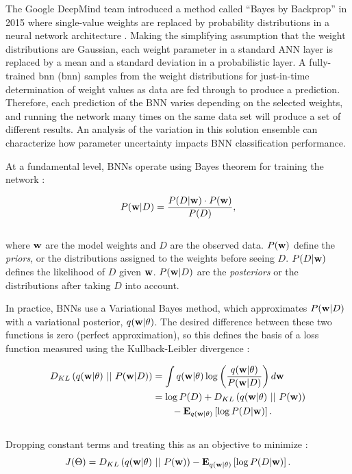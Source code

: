 The Google DeepMind team introduced a method called ``Bayes by Backprop'' in 2015 where single-value weights are replaced by probability distributions in a neural network architecture \citep{blundell_weight_2015}. Making the simplifying assumption that the weight distributions are Gaussian, each weight parameter in a standard ANN layer is replaced by a mean and a standard deviation in a probabilistic layer. A fully-trained \acrlong{bnn} (\acrshort{bnn}) samples from the weight distributions for just-in-time determination of weight values as data are fed through to produce a prediction. Therefore, each prediction of the BNN varies depending on the selected weights, and running the network many times on the same data set will produce a set of different results. An analysis of the variation in this solution ensemble can characterize how parameter uncertainty impacts BNN classification performance.

At a fundamental level, BNNs operate using Bayes theorem for training the network \citep{webster_probabilistic_2021}:

\begin{equation}
    \label{eq:bayesrule}
    P({\bf w} \vert D) = \frac{P(D \vert {\bf w}) \cdot P({\bf w})}{P(D)},
\end{equation}
\\
where ${\bf w}$ are the model weights and $D$ are the observed data. $P({\bf w})$ define the \textit{priors}, or the distributions assigned to the weights before seeing $D$. $P(D \vert {\bf w})$ defines the likelihood of $D$ given ${\bf w}$. $P({\bf w} \vert D)$ are the \textit{posteriors} or the distributions after taking $D$ into account.

In practice, BNNs use a Variational Bayes method, which approximates $P({\bf w} \vert D)$ with a variational posterior, $q({\bf w} \vert \theta)$. The desired difference between these two functions is zero (perfect approximation), so this defines the basis of a loss function measured using the Kullback-Leibler divergence \citep{webster_probabilistic_2021}:

\begin{equation}
    \label{eq:bnn_loss}
    \begin{aligned}
    D_{KL}\left(q({\bf w} \vert \theta)\ \vert\vert\ P({\bf w} \vert D)\right) &= \int{q({\bf w} \vert \theta) \log \left({\frac{q({\bf w} \vert \theta)}{P({\bf w} \vert D)}}\right) d{\bf w}} \\
    &= \log P(D) + D_{KL}\left(q({\bf w} \vert \theta)\ \vert\vert\ P({\bf w})\right) \\ 
    &\qquad- \mathbf{E}_{q({\bf w} \vert \theta)}\left[\log P(D \vert {\bf w})\right].
    \end{aligned}
\end{equation}
\\
Dropping constant terms and treating this as an objective to minimize \citep{blundell_weight_2015}:
\begin{equation}
    \label{eq:bnn_objective}
    J(\Theta) = D_{KL}\left(q({\bf w} \vert \theta)\ \vert\vert\ P({\bf w})\right) - \mathbf{E}_{q({\bf w} \vert \theta)}\left[\log P(D \vert {\bf w})\right].
\end{equation}

